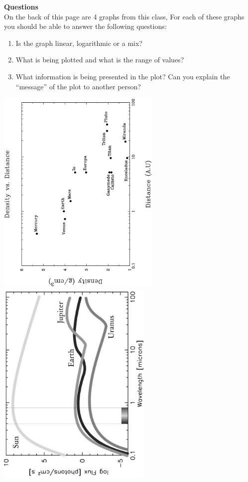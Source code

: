 {\bf Questions}\\

On the back of this page are 4 graphs from this class,  For each of
these graphs you should be able to answer the following questions:

\begin{enumerate}
\item Is the graph linear, logarithmic or a mix?
\item What is being plotted and what is the range of values?
\item What information is being presented in the plot?  Can you explain
the ``message'' of the plot to another person?
\end{enumerate}

\clearpage

\begin{center}
\vfill
\mbox{\includegraphics[height=10cm]{./images/DenvDist.eps}}
\makebox[0.5cm]{}
\mbox{\includegraphics[height=10cm]{./images/SolarFlux.ps}}

\end{center}

